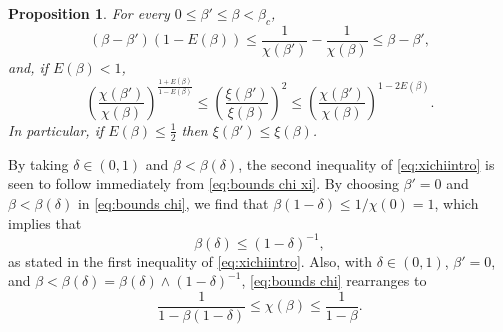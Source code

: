 \documentclass[11pt,a4paper]{article}
\numberwithin{equation}{section}
\theoremstyle{plain}
\newtheorem{Prop}[Thm]{Proposition}
\theoremstyle{definition}
\newcommand\1{\mathds{1}}
\begin{document}
\begin{Prop}
\label{prop: rough bounds chi xi}
For every $0\leq \beta'\leq \beta < \beta_c$,
\begin{equation}\label{eq:bounds chi}
	(\beta-\beta')(1-E(\beta))\leq \frac{1}{\chi(\beta')}-\frac{1}{\chi(\beta)}\leq \beta-\beta',
\end{equation}
and, if $E(\beta)<1$,
\begin{equation}\label{eq:bounds chi xi} \left(\frac{\chi(\beta')}{\chi(\beta)}\right)^{\frac{1+E(\beta)}{1-E(\beta)}}
    \leq \left(\frac{\xi(\beta')}{\xi(\beta)}\right)^2
    \leq \left(\frac{\chi(\beta')}{\chi(\beta)}\right)^{ 1-2E(\beta)}.
\end{equation}
In particular, if $E(\beta)\le \frac 12$ then
$\xi(\beta') \le \xi(\beta)$.
\end{Prop}


By taking $\delta\in (0,1)$ and $\beta <\beta(\delta)$, the
second inequality of \eqref{eq:xichiintro} is seen to follow
immediately from \eqref{eq:bounds chi xi}.  By choosing
$\beta'=0$ and $\beta<\beta(\delta)$ in \eqref{eq:bounds chi}, we find that
$\beta (1-\delta)\leq 1/\chi(0)=1$,
which implies that
\begin{equation}\label{eq:bound on beta(delta)}
	\beta(\delta)\leq (1-\delta)^{-1},
\end{equation}
as stated in the first inequality of \eqref{eq:xichiintro}.
Also, with $\delta\in (0,1)$, $\beta'=0$, and $\beta<\beta(\delta)=\beta(\delta)\wedge (1-\delta)^{-1}$,
\eqref{eq:bounds chi} rearranges to
\begin{equation}\label{eq:chi0}
	\frac{1}{1-\beta(1-\delta)}\leq \chi(\beta)\leq \frac{1}{1-\beta}.
\end{equation}
\end{document}

